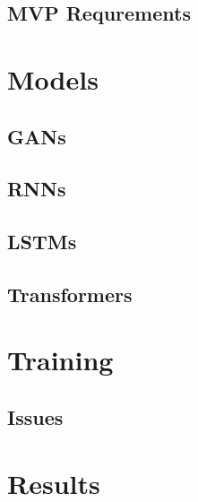 \subsection{MVP Requrements}

\section{Models}

\subsection{GANs}

\subsection{RNNs}

\subsection{LSTMs}

\subsection{Transformers}

\section{Training}

\subsection{Issues}

\section{Results}